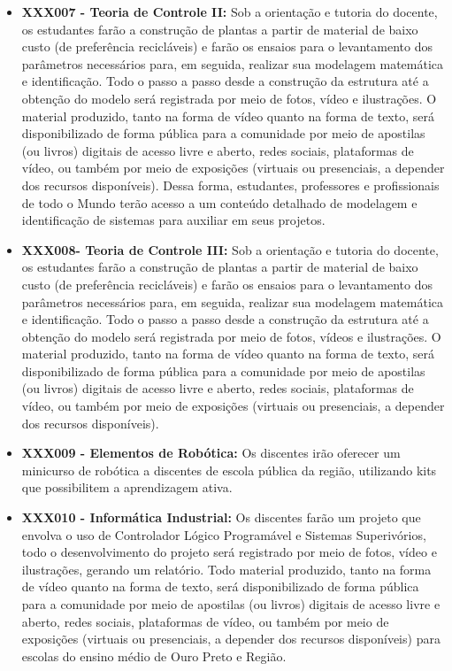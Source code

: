 \documentclass[
	12pt,				%
	openright,			%
	oneside,			%
	a4paper,			%
	english,			%
	brazil				%
	]{abntex2}
\begin{document}
\begin{itemize}
    \item \textbf{XXX007 - Teoria de Controle II:} Sob a orientação e tutoria do docente, os estudantes farão a construção de plantas a partir de material de baixo custo (de preferência recicláveis) e farão os ensaios para o levantamento dos parâmetros necessários para, em seguida, realizar sua modelagem matemática e identificação. Todo o passo a passo desde a construção da estrutura até a obtenção do modelo será registrada por meio de fotos, vídeo e ilustrações. O material produzido, tanto na forma de vídeo quanto na forma de texto, será disponibilizado de forma pública para a comunidade por meio de apostilas (ou livros) digitais de acesso livre e aberto, redes sociais, plataformas de vídeo, ou também por meio de exposições (virtuais ou presenciais, a depender dos recursos disponíveis). Dessa forma, estudantes, professores e profissionais de todo o Mundo terão acesso a um conteúdo detalhado de modelagem e identificação de sistemas para auxiliar em seus projetos.

    \item \textbf{XXX008- Teoria de Controle III:}  Sob a orientação e tutoria do docente, os estudantes farão a construção de plantas a partir de material de baixo custo (de preferência recicláveis) e farão os ensaios para o levantamento dos parâmetros necessários para, em seguida, realizar sua modelagem matemática e identificação. Todo o passo a passo desde a construção da estrutura até a obtenção do modelo será registrada por meio de fotos, vídeos e ilustrações. O material produzido, tanto na forma de vídeo quanto na forma de texto, será disponibilizado de forma pública para a comunidade por meio de apostilas (ou livros) digitais de acesso livre e aberto, redes sociais, plataformas de vídeo, ou também por meio de exposições (virtuais ou presenciais, a depender dos recursos disponíveis).

    \item \textbf{XXX009 - Elementos de Robótica:} Os discentes irão oferecer um minicurso de robótica a discentes de escola pública da região, utilizando kits que possibilitem a aprendizagem ativa.

    \item \textbf{XXX010 - Informática Industrial:} Os discentes farão um projeto que envolva o uso de Controlador Lógico Programável e Sistemas Superivórios, todo o desenvolvimento do projeto será registrado por meio de fotos, vídeo e ilustrações, gerando um relatório. Todo material produzido, tanto na forma de vídeo quanto na forma de texto, será disponibilizado de forma pública para a comunidade por meio de apostilas (ou livros) digitais de acesso livre e aberto, redes sociais, plataformas de vídeo, ou também por meio de exposições (virtuais ou presenciais, a depender dos recursos disponíveis) para escolas do ensino médio de Ouro Preto e Região.


\end{itemize}
\end{document}
